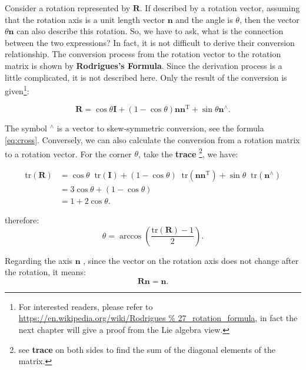 Consider a rotation represented by $ \mathbf{R} $. If described by a rotation vector, assuming that the rotation axis is a unit length vector $ \mathbf{n} $ and the angle is $ \theta $, then the vector $ \theta \mathbf{n} $ can also describe this rotation. So, we have to ask, what is the connection between the two expressions? In fact, it is not difficult to derive their conversion relationship. The conversion process from the rotation vector to the rotation matrix is shown by \textbf{Rodrigues's Formula}. Since the derivation process is a little complicated, it is not described here. Only the result of the conversion is given\footnote{For interested readers, please refer to \url{https://en.wikipedia.org/wiki/Rodrigues \% 27_rotation_formula}, in fact the next chapter will give a proof from the Lie algebra view.}:

\begin{equation}
\label{eq:rogridues}
\mathbf{R} = \cos \theta \mathbf{I} + \left({ 1 - \cos \theta } \right) \mathbf{n} { \mathbf {n} ^ \mathrm{T} } + \sin \theta { \mathbf{n}^ \wedge }.
\end{equation}

The symbol $ ^ \wedge $ is a vector to skew-symmetric conversion, see the formula \eqref{eq:cross}. Conversely, we can also calculate the conversion from a rotation matrix to a rotation vector. For the corner $ \theta $, take the \textbf{trace} \footnote {see \textbf{trace} on both sides to find the sum of the diagonal elements of the matrix. }, we have:

\begin{equation}
\begin{aligned}
\mathrm{tr} \left( \mathbf{R} \right) &= \cos \theta \mathop{}\!\mathrm{tr}\left( \mathbf{I} \right) + \left( {1 - \cos \theta } \right) \mathop{}\!\mathrm{tr} \left( { \mathbf{n} {\mathbf{n}^\mathrm{T}}} \right) + \sin \theta \mathop{}\!\mathrm{tr} ({\mathbf{n}^ \wedge })\\
&= 3\cos \theta  + (1 - \cos \theta )\\
&= 1 + 2\cos \theta .
\end{aligned} 
\end{equation}

therefore:
\begin{equation}
\label{eq:R2theta}
\theta = \arccos ( \frac{\mathrm{tr}(\mathbf{R}) - 1}{2}  ) .
\end{equation}

Regarding the axis $ \mathbf{n} $ , since the vector on the rotation axis does not change after the rotation, it means:
\begin{equation}
\mathbf{R} \mathbf{n} = \mathbf{n}.
\end{equation}

